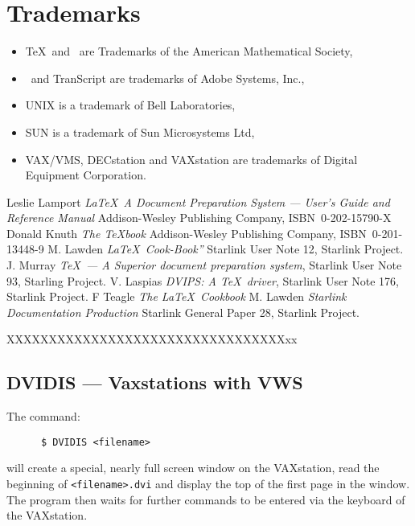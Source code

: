 \section{Trademarks}
\begin{itemize}
\item \TeX\ and \MF\ are Trademarks of the American Mathematical Society,
\item \PS\ and TranScript are trademarks of Adobe Systems, Inc.,
\item UNIX is a trademark of Bell Laboratories,
\item SUN is a trademark of Sun Microsystems Ltd,
\item VAX/VMS, DECstation and VAXstation are trademarks of Digital Equipment 
Corporation.
\end{itemize}


\begin{thebibliography}{99}

 Leslie Lamport {\em \LaTeX\ A Document Preparation System
--- User's Guide and  Reference Manual\/} Addison-Wesley Publishing Company,
ISBN~0-202-15790-X 
 Donald Knuth {\em The \TeX book\/} Addison-Wesley Publishing
Company, ISBN~0-201-13448-9
 M. Lawden {\em \LaTeX\ Cook-Book''\/} Starlink User Note 12,
Starlink Project. 
 J. Murray {\em \TeX\ --- A Superior document preparation 
system\/}, Starlink User Note 93, Starling Project. 
 V. Laspias {\em DVIPS: A \TeX\ driver\/}, Starlink User Note
176, Starlink Project.
 F Teagle {\em The \LaTeX\ Cookbook\/} 
 M. Lawden  {\em Starlink Documentation Production\/} Starlink
General Paper 28, Starlink Project.
\end{thebibliography}




XXXXXXXXXXXXXXXXXXXXXXXXXXXXXXXXXxx


\subsection{DVIDIS --- Vaxstations with VWS}
\label{se:dvidis}

The command:
\begin{verbatim}
      $ DVIDIS <filename>
\end{verbatim}
will create a special, nearly full screen window on the VAXstation, read the
beginning of {\tt <filename>.dvi} and display the top of the first page in 
the window. The program then waits for further commands to be entered via the
keyboard of the VAXstation.

